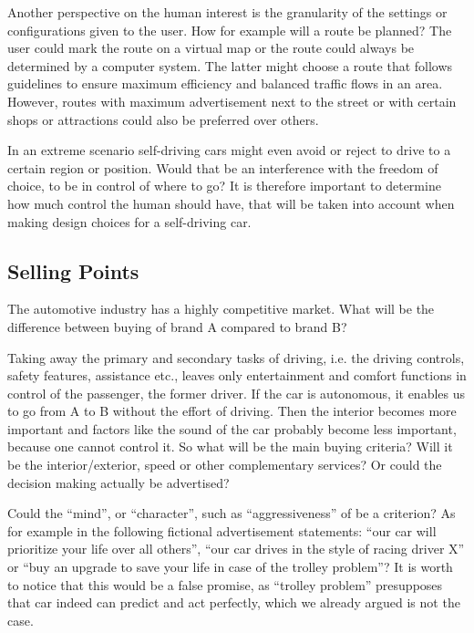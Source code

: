 Another perspective on the human interest is the granularity of the settings or configurations given to the user. How for example will a route be planned? The user could mark the route on a virtual map or the route could always be determined by a computer system. The latter might choose a route that follows guidelines to ensure maximum efficiency and balanced traffic flows in an area. However, routes with maximum advertisement next to the street or with certain shops or attractions could also be preferred over others. 

In an extreme scenario self-driving cars might even avoid or reject to drive to a certain region or position. Would that be an interference with the freedom of choice, to be in control of where to go? It is therefore important to determine how much control the human should have, that will be taken into account when making design choices for a self-driving car. 


\subsection{Selling Points}
\label{sec:EAofNONTC:SellingPoints}

The automotive industry has a highly competitive market. What will be the difference between buying  of brand A compared to brand B? 

Taking away the primary and secondary tasks of driving, i.e. the driving controls, safety features, assistance etc., leaves only entertainment and comfort functions in control of the passenger, the former driver. If the car is autonomous, it enables us to go from A to B without the effort of driving. Then the interior becomes more important and factors like the sound of the car probably become less important, because one cannot control it. So what will be the main buying criteria? Will it be the interior/exterior, speed or other complementary services? Or could the decision making actually be advertised?  

Could the \enquote{mind}, or \enquote{character}, such as \enquote{aggressiveness} of  be a criterion? As for example in the following fictional advertisement statements: \enquote{our car will prioritize your life over all others}, \enquote{our car drives in the style of racing driver X} or \enquote{buy an upgrade to save your life in case of the trolley problem}? It is worth to notice that this would be a false promise, as \enquote{trolley problem} presupposes that car indeed can predict and act perfectly, which we already argued is not the case.

